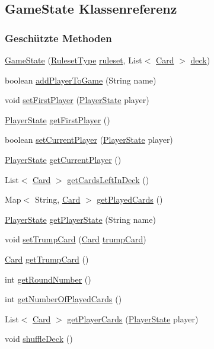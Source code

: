 \hypertarget{a00061}{\subsection{Game\-State Klassenreferenz}
\label{a00061}
}
\subsubsection*{Geschützte Methoden}
\begin{DoxyCompactItemize}
\item 
\hyperlink{a00061_af5b691374c15ef96a61653cfb47a787f}{Game\-State} (\hyperlink{a00066}{Ruleset\-Type} \hyperlink{a00061_ab1a0de7ba523f1538143a3924bc5db91}{ruleset}, List$<$ \hyperlink{a00054}{Card} $>$ \hyperlink{a00061_ada90d280bf05807755067241c0c120b1}{deck})
\item 
boolean \hyperlink{a00061_ade89a46dafb23437aab3d1daaf9ce249}{add\-Player\-To\-Game} (String name)
\item 
void \hyperlink{a00061_abfad91f4802937b01bda5b2fc4ad499c}{set\-First\-Player} (\hyperlink{a00065}{Player\-State} player)
\item 
\hyperlink{a00065}{Player\-State} \hyperlink{a00061_a7b443a96d6cc6e723b99b00d441fc5eb}{get\-First\-Player} ()
\item 
boolean \hyperlink{a00061_aad1368713e8ecbe803fcde62393d008e}{set\-Current\-Player} (\hyperlink{a00065}{Player\-State} player)
\item 
\hyperlink{a00065}{Player\-State} \hyperlink{a00061_ad3e8a11e9c53ca1b4bb6e753e48ef5ed}{get\-Current\-Player} ()
\item 
List$<$ \hyperlink{a00054}{Card} $>$ \hyperlink{a00061_a616ada4426d7bc8a43438dc039be3a8f}{get\-Cards\-Left\-In\-Deck} ()
\item 
Map$<$ String, \hyperlink{a00054}{Card} $>$ \hyperlink{a00061_a517d55888dcd3b8bb38c55a8d7b8cf89}{get\-Played\-Cards} ()
\item 
\hyperlink{a00065}{Player\-State} \hyperlink{a00061_a5a7c0e8284adefd018fe67ccb65a571f}{get\-Player\-State} (String name)
\item 
void \hyperlink{a00061_a0de696b9652ce9a542dd7402dd0d151b}{set\-Trump\-Card} (\hyperlink{a00054}{Card} \hyperlink{a00061_ab25322829797b0de34227a8e2cdb1929}{trump\-Card})
\item 
\hyperlink{a00054}{Card} \hyperlink{a00061_a278ccc7c69243be691f69d421cf7420a}{get\-Trump\-Card} ()
\item 
int \hyperlink{a00061_acd8fc0de78babbeb68f3e5ebfd89b340}{get\-Round\-Number} ()
\item 
int \hyperlink{a00061_a2190154b3e89124d86d0ed472dba5e0a}{get\-Number\-Of\-Played\-Cards} ()
\item 
List$<$ \hyperlink{a00054}{Card} $>$ \hyperlink{a00061_a68d47ae23b4bb4d81b2ef9905bab74b5}{get\-Player\-Cards} (\hyperlink{a00065}{Player\-State} player)
\item 
\hypertarget{a00061_aebdb0f340a4800e7b841571ffc1f5da9}{void \hyperlink{a00061_aebdb0f340a4800e7b841571ffc1f5da9}{shuffle\-Deck} ()}\label{a00061_aebdb0f340a4800e7b841571ffc1f5da9}


\end{DoxyCompactItemize}
